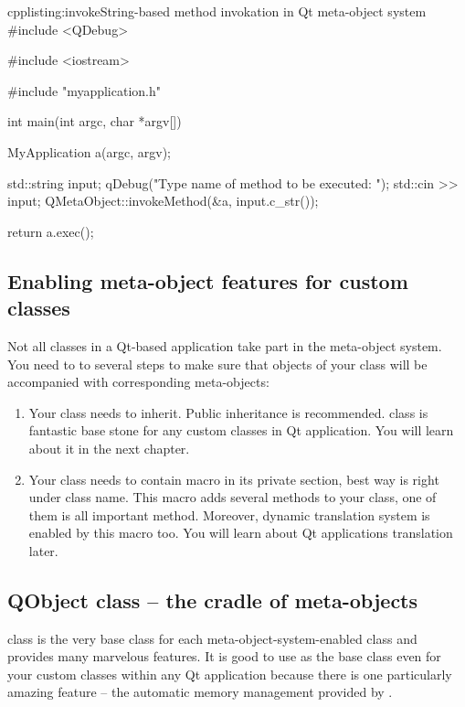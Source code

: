 \begin{fdoccode}{cpp}{listing:invoke}{String-based method invokation in Qt meta-object system}
#include <QDebug>

#include <iostream>

#include "myapplication.h"


int main(int argc, char *argv[]){
    MyApplication a(argc, argv);
    
    std::string input;
    qDebug("Type name of method to be executed: ");
    std::cin >> input;
    QMetaObject::invokeMethod(&a, input.c_str());

    return a.exec();
}
\end{fdoccode}

\subsection{Enabling meta-object features for custom classes}
Not all classes in a Qt-based application take part in the meta-object system. You need to to several steps to make sure that objects of your class will be accompanied with corresponding meta-objects:

\begin{enumerate}
\item Your class needs to inherit. Public inheritance is recommended. class is fantastic base stone for any custom classes in Qt application. You will learn about it in the next chapter.
\item Your class needs to contain macro in its private section, best way is right under class name. This macro adds several methods to your class, one of them is all important method. Moreover, dynamic translation system is enabled by this macro too. You will learn about Qt applications translation later.
\end{enumerate}

\subsection{QObject class -- the cradle of meta-objects}
 class is the very base class for each meta-object-system-enabled class and provides many marvelous features. It is good to use as the base class even for your custom classes within any Qt application because there is one particularly amazing feature -- the automatic memory management provided by .


